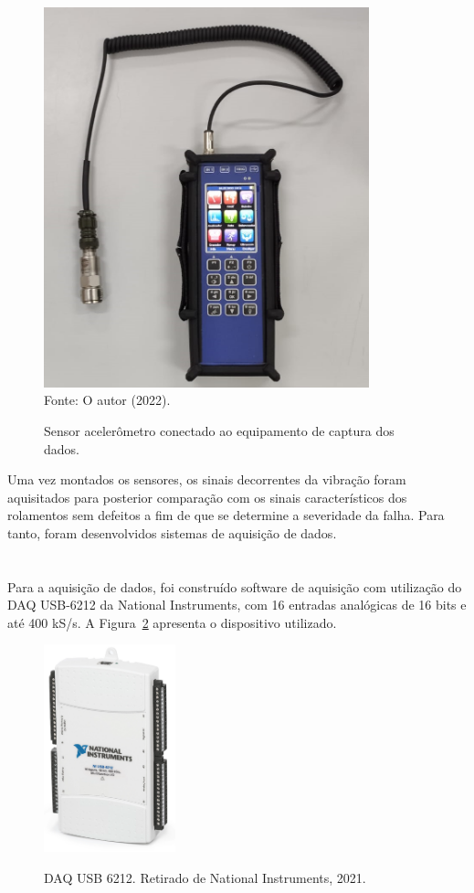 \documentclass[
	12pt,				
	oneside,			
	a4paper,			
	english,			
	brazil,			
	]{abntex2ppgsi}
\begin{document}
\begin{figure}[H]
\centering
\caption {Sensor acelerômetro conectado ao equipamento de captura dos dados.}
\includegraphics[width=\textwidth,height=110mm,keepaspectratio]{adash} \\
Fonte: O autor (2022).
\label{adash}
\end{figure} 


Uma vez montados os sensores, os sinais decorrentes da vibração foram aquisitados para posterior comparação com os sinais característicos dos rolamentos sem defeitos a fim de que se determine a severidade da falha. Para tanto, foram desenvolvidos sistemas de aquisição de dados. 

\section{}

Para a aquisição de dados, foi construído software de aquisição com utilização do DAQ USB-6212 da National Instruments, com 16 entradas analógicas de 16 bits e até 400 kS/s. A Figura~\ref{USB6212} apresenta o dispositivo utilizado.

\begin{figure}[H]
\centering
\caption {DAQ USB 6212. Retirado de National Instruments, 2021.}
\includegraphics[width=\textwidth,height=60mm,keepaspectratio]{USB6212}
\label{USB6212}
\end{figure}
\end{document}
